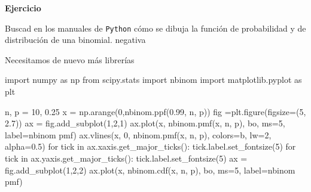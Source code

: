 \documentclass[
  letterpaper,
  DIV=11,
  numbers=noendperiod]{scrreprt}
\newenvironment{Shaded}{\begin{snugshade}}{\end{snugshade}}
\newcommand{\ControlFlowTok}[1]{\textcolor[rgb]{0.00,0.23,0.31}{#1}}
\newcommand{\DecValTok}[1]{\textcolor[rgb]{0.68,0.00,0.00}{#1}}
\newcommand{\FloatTok}[1]{\textcolor[rgb]{0.68,0.00,0.00}{#1}}
\newcommand{\ImportTok}[1]{\textcolor[rgb]{0.00,0.46,0.62}{#1}}
\newcommand{\KeywordTok}[1]{\textcolor[rgb]{0.00,0.23,0.31}{#1}}
\newcommand{\NormalTok}[1]{\textcolor[rgb]{0.00,0.23,0.31}{#1}}
\newcommand{\OperatorTok}[1]{\textcolor[rgb]{0.37,0.37,0.37}{#1}}
\newcommand{\StringTok}[1]{\textcolor[rgb]{0.13,0.47,0.30}{#1}}
\begin{document}
\textbf{Ejercicio}

Buscad en los manuales de \texttt{Python} cómo se dibuja la función de
probabilidad y de distribución de una binomial. negativa

Necesitamos de nuevo más librerías

\begin{Shaded}
\begin{Highlighting}[]
\ImportTok{import}\NormalTok{ numpy }\ImportTok{as}\NormalTok{ np}
\ImportTok{from}\NormalTok{ scipy.stats }\ImportTok{import}\NormalTok{ nbinom}
\ImportTok{import}\NormalTok{ matplotlib.pyplot }\ImportTok{as}\NormalTok{ plt}
\end{Highlighting}
\end{Shaded}

\begin{Shaded}
\begin{Highlighting}[]
\NormalTok{n, p }\OperatorTok{=} \DecValTok{10}\NormalTok{, }\FloatTok{0.25}
\NormalTok{x }\OperatorTok{=}\NormalTok{ np.arange(}\DecValTok{0}\NormalTok{,nbinom.ppf(}\FloatTok{0.99}\NormalTok{, n, p))}
\NormalTok{fig }\OperatorTok{=}\NormalTok{plt.figure(figsize}\OperatorTok{=}\NormalTok{(}\DecValTok{5}\NormalTok{, }\FloatTok{2.7}\NormalTok{))}
\NormalTok{ax }\OperatorTok{=}\NormalTok{ fig.add\_subplot(}\DecValTok{1}\NormalTok{,}\DecValTok{2}\NormalTok{,}\DecValTok{1}\NormalTok{)}
\NormalTok{ax.plot(x, nbinom.pmf(x, n, p), }\StringTok{\textquotesingle{}bo\textquotesingle{}}\NormalTok{, ms}\OperatorTok{=}\DecValTok{5}\NormalTok{, label}\OperatorTok{=}\StringTok{\textquotesingle{}nbinom pmf\textquotesingle{}}\NormalTok{)}
\NormalTok{ax.vlines(x, }\DecValTok{0}\NormalTok{, nbinom.pmf(x, n, p), colors}\OperatorTok{=}\StringTok{\textquotesingle{}b\textquotesingle{}}\NormalTok{, lw}\OperatorTok{=}\DecValTok{2}\NormalTok{, alpha}\OperatorTok{=}\FloatTok{0.5}\NormalTok{)}
\ControlFlowTok{for}\NormalTok{ tick }\KeywordTok{in}\NormalTok{ ax.xaxis.get\_major\_ticks():}
\NormalTok{  tick.label.set\_fontsize(}\DecValTok{5}\NormalTok{)}
\ControlFlowTok{for}\NormalTok{ tick }\KeywordTok{in}\NormalTok{ ax.yaxis.get\_major\_ticks():}
\NormalTok{  tick.label.set\_fontsize(}\DecValTok{5}\NormalTok{) }
\NormalTok{ax }\OperatorTok{=}\NormalTok{ fig.add\_subplot(}\DecValTok{1}\NormalTok{,}\DecValTok{2}\NormalTok{,}\DecValTok{2}\NormalTok{)}
\NormalTok{ax.plot(x, nbinom.cdf(x, n, p), }\StringTok{\textquotesingle{}bo\textquotesingle{}}\NormalTok{, ms}\OperatorTok{=}\DecValTok{5}\NormalTok{, label}\OperatorTok{=}\StringTok{\textquotesingle{}nbinom pmf\textquotesingle{}}\NormalTok{)}

\end{Highlighting}
\end{Shaded}
\end{document}
